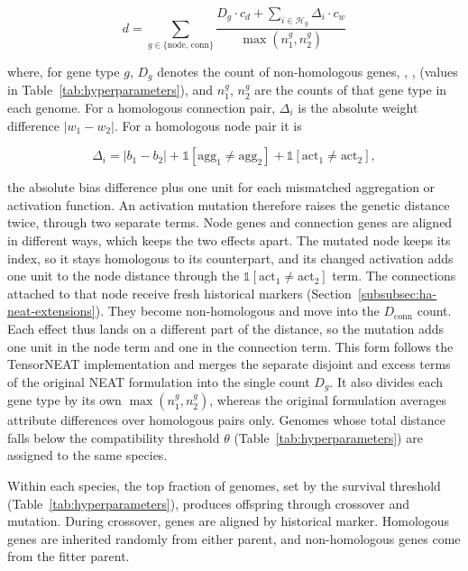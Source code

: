\[d = \sum_{g \in \{\text{node},\,\text{conn}\}} \frac{D_g \cdot c_d + \sum_{i \in \mathcal{H}_g} \Delta_i \cdot c_w}{\max(n_1^g, n_2^g)}\]

where, for gene type $g$, $D_g$ denotes the count of non-homologous genes, , ,  (values in Table~\ref{tab:hyperparameters}), and $n_1^g$, $n_2^g$ are the counts of that gene type in each genome.
For a homologous connection pair, $\Delta_i$ is the absolute weight difference $|w_1 - w_2|$.
For a homologous node pair it is

\[\Delta_i = |b_1 - b_2| + \mathbb{1}[\text{agg}_1 \neq \text{agg}_2] + \mathbb{1}[\text{act}_1 \neq \text{act}_2],\]

the absolute bias difference plus one unit for each mismatched aggregation or activation function.
An activation mutation therefore raises the genetic distance twice, through two separate terms. Node genes and connection genes are aligned in different ways, which keeps the two effects apart. The mutated node keeps its index, so it stays homologous to its counterpart, and its changed activation adds one unit to the node distance through the $\mathbb{1}[\text{act}_1 \neq \text{act}_2]$ term. The connections attached to that node receive fresh historical markers (Section~\ref{subsubsec:ha-neat-extensions}). They become non-homologous and move into the $D_{\text{conn}}$ count. Each effect thus lands on a different part of the distance, so the mutation adds one unit in the node term and one in the connection term.
This form follows the TensorNEAT \parencite{wang_tensorized_2024} implementation and merges the separate disjoint and excess terms of the original NEAT formulation into the single count $D_g$.
It also divides each gene type by its own $\max(n_1^g, n_2^g)$, whereas the original formulation averages attribute differences over homologous pairs only. 
Genomes whose total distance falls below the compatibility threshold $\theta$ (Table~\ref{tab:hyperparameters}) are assigned to the same species.

Within each species, the top fraction of genomes, set by the survival threshold (Table~\ref{tab:hyperparameters}), produces offspring through crossover and mutation.
During crossover, genes are aligned by historical marker. Homologous genes are inherited randomly from either parent, and non-homologous genes come from the fitter parent.

